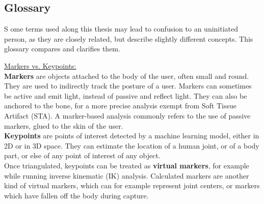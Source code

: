 
{} \mtcaddchapter
\label{Ann:gloss}

\vspace*{-1.6cm}
\begin{flushright}
\section*{\fontsize{20pt}{20pt}\selectfont\textnormal{Glossary}}
\end{flushright}
\vspace{-0.2cm}


\chead[\fancyplain{}{}]
      {\fancyplain{}{}}
\lfoot[\fancyplain{}{}]
      {\fancyplain{}{}}
\cfoot[\fancyplain{}{\thepage}]
      {\fancyplain{}{\thepage}}
\rfoot[\fancyplain{}{}]%
     {\fancyplain{}{\scriptsize}}


\lettrine[lines=1]{S}{ }ome terms used along this thesis may lead to confusion to an uninitiated person, as they are closely related, but describe slightly different concepts. This glossary compares and clarifies them.

\vspace*{1cm}

\noindent\underline{Markers vs. Keypoints:}\\
\textbf{Markers} are objects attached to the body of the user, often small and round. They are used to indirectly track the posture of a user. Markers can sometimes be active and emit light, instead of passive and reflect light. They can also be anchored to the bone, for a more precise analysis exempt from Soft Tissue Artifact (STA). A marker-based analysis commonly refers to the use of passive markers, glued to the skin of the user.\\
\textbf{Keypoints} are points of interest detected by a machine learning model, either in 2D or in 3D space. They can estimate the location of a human joint, or of a body part, or else of any point of interest of any object.\\
Once triangulated, keypoints can be treated as \textbf{virtual markers}, for example while running inverse kinematic (IK) analysis. Calculated markers are another kind of virtual markers, which can for example represent joint centers, or markers which have fallen off the body during capture.

